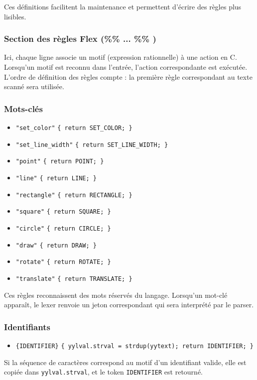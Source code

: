 \documentclass[12pt,a4paper]{article}
\begin{document}
Ces définitions facilitent la maintenance et permettent d’écrire des règles plus lisibles.


\subsubsection{Section des règles Flex (\%\% ... \%\% )}

Ici, chaque ligne associe un motif (expression rationnelle) à une action en C. Lorsqu’un motif est reconnu dans l’entrée, l’action correspondante est exécutée. L’ordre de définition des règles compte : la première règle correspondant au texte scanné sera utilisée.

\subsubsection*{Mots-clés}
\begin{itemize}
    \item \texttt{"set\_color"} \hfill \texttt{\{ return SET\_COLOR; \}}
    \item \texttt{"set\_line\_width"} \hfill \texttt{\{ return SET\_LINE\_WIDTH; \}}
    \item \texttt{"point"} \hfill \texttt{\{ return POINT; \}}
    \item \texttt{"line"} \hfill \texttt{\{ return LINE; \}}
    \item \texttt{"rectangle"} \hfill \texttt{\{ return RECTANGLE; \}}
    \item \texttt{"square"} \hfill \texttt{\{ return SQUARE; \}}
    \item \texttt{"circle"} \hfill \texttt{\{ return CIRCLE; \}}
    \item \texttt{"draw"} \hfill \texttt{\{ return DRAW; \}}
    \item \texttt{"rotate"} \hfill \texttt{\{ return ROTATE; \}}
    \item \texttt{"translate"} \hfill \texttt{\{ return TRANSLATE; \}}
\end{itemize}
Ces règles reconnaissent des mots réservés du langage. Lorsqu’un mot-clé apparaît, le lexer renvoie un jeton correspondant qui sera interprété par le parser.

\subsubsection*{Identifiants}
\begin{itemize}
    \item \texttt{\{IDENTIFIER\}} \hfill \texttt{\{ yylval.strval = strdup(yytext); return IDENTIFIER; \}}
\end{itemize}
Si la séquence de caractères correspond au motif d’un identifiant valide, elle est copiée dans \texttt{yylval.strval}, et le token \texttt{IDENTIFIER} est retourné.
\end{document}
